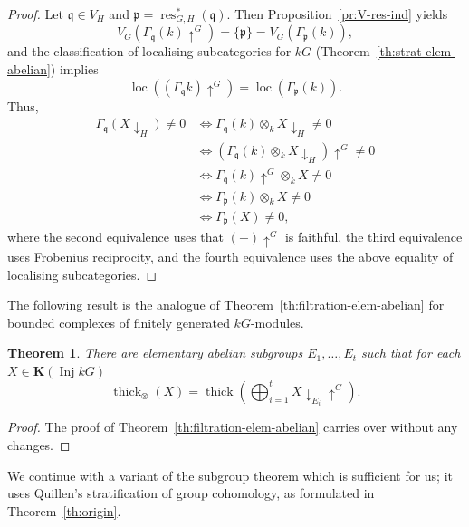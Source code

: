 \documentclass{amsart}[a4]
\newtheorem{theorem}{Theorem}[section]
\theoremstyle{definition}
\theoremstyle{remark}
\numberwithin{equation}{section}
\newcommand{\Inj}{\operatorname{Inj}}
\newcommand{\loc}{\operatorname{loc}}
\newcommand{\res}{\operatorname{res}}
\newcommand{\thick}{\operatorname{thick}}
\newcommand{\da}{{\downarrow}}
\newcommand{\ua}{{\uparrow}}
\newcommand{\bfK}{\mathbf K}
\newcommand{\fp}{\mathfrak{p}}
\newcommand{\fq}{\mathfrak{q}}
\let\Gamma\varGamma
\begin{document}
\begin{proof}
Let $\fq \in V_{H}$ and $\fp=\res_{G,H}^*(\fq)$. Then
Proposition~\ref{pr:V-res-ind} yields
\[ 
 V_G(\Gamma_\fq(k)\ua^G)=\{\fp \}= V_G(\Gamma_\fp(k)),
\] 
and the classification of localising subcategories for $kG$
(Theorem~\ref{th:strat-elem-abelian})  implies 
\[ 
\loc((\Gamma_\fq k)\ua^G)=\loc(\Gamma_\fp(k)). 
\]
Thus,
\begin{align*} 
\Gamma_\fq(X\da_{H})\ne 0 
&\iff \Gamma_\fq(k)\otimes_k X\da_{H}\ne 0 \\
&\iff (\Gamma_\fq(k)\otimes_k X\da_{H})\ua^G\ne 0 \\
&\iff \Gamma_\fq(k)\ua^G\otimes_k X \ne 0 \\
&\iff \Gamma_\fp(k)\otimes_k X\ne 0 \\
&\iff \Gamma_\fp (X) \ne 0,
\end{align*}
where the second equivalence uses that $(-)\ua^G$ is faithful,  the
third equivalence uses Frobenius reciprocity, and  the fourth
equivalence uses the above equality of localising subcategories.
\end{proof}

The following result is the analogue of
Theorem~\ref{th:filtration-elem-abelian} for bounded complexes of
finitely generated $kG$-modules.

\begin{theorem}\label{th:filtration-finite-group}
  There are elementary abelian subgroups $E_1,\ldots,E_t$ such that
  for each $X\in \bfK(\Inj kG)$
  \[\thick_\otimes(X)=\thick\left(\bigoplus_{i=1}^t X\da_{E_i}\ua^G\right).\]
\end{theorem}
\begin{proof}
The proof of Theorem~\ref{th:filtration-elem-abelian} carries over
without any changes.
\end{proof}

We continue with a variant of the subgroup theorem which is sufficient
for us; it uses Quillen's stratification of group cohomology, as
formulated in Theorem~\ref{th:origin}.
\end{document}
